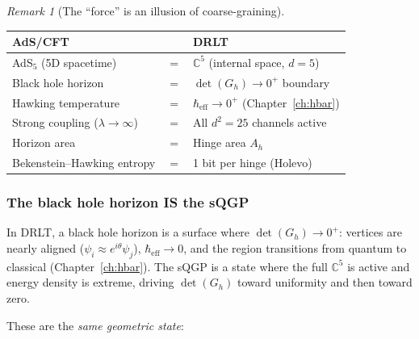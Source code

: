 \documentclass[12pt]{article}
\theoremstyle{remark}
\newtheorem{remark}[theorem]{Remark}
\theoremstyle{definition}
\newcommand{\CC}{\mathbb{C}}
\begin{document}
\begin{remark}[The ``force'' is an illusion of coarse-graining]
\begin{center}
\begin{tabular}{lcl}
\hline
AdS/CFT & & DRLT \\
\hline
AdS$_5$ (5D spacetime) & $=$ & $\CC^5$ (internal space, $d = 5$) \\
Black hole horizon & $=$ & $\det(G_h) \to 0^+$ boundary \\
Hawking temperature & $=$ & $\hbar_\text{eff} \to 0^+$ (Chapter~\ref{ch:hbar}) \\
Strong coupling ($\lambda \to \infty$) & $=$ & All $d^2 = 25$ channels active \\
Horizon area & $=$ & Hinge area $A_h$ \\
Bekenstein--Hawking entropy & $=$ & 1 bit per hinge (Holevo) \\
\hline
\end{tabular}
\end{center}

\subsubsection{The black hole horizon IS the sQGP}

In DRLT, a black hole horizon is a surface where $\det(G_h) \to 0^+$: vertices are nearly aligned ($\psi_i \approx e^{i\theta}\psi_j$), $\hbar_\text{eff} \to 0$, and the region transitions from quantum to classical (Chapter~\ref{ch:hbar}). The sQGP is a state where the full $\CC^5$ is active and energy density is extreme, driving $\det(G_h)$ toward uniformity and then toward zero.

These are the \emph{same geometric state}:


\end{remark}
\end{document}
